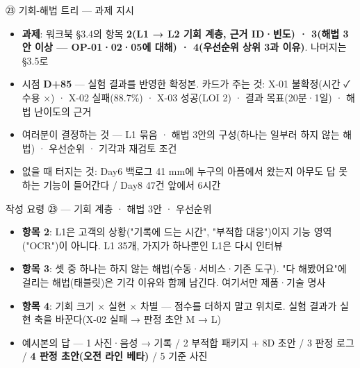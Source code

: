 \begin{frame}{㉓ 기회-해법 트리 — 과제 지시}
\begin{itemize}
\item \textbf{과제}: 워크북 §3.4의 항목 \textbf{2(L1 → L2 기회 계층, 근거 ID·빈도) · 3(해법 3안 이상 — OP-01·02·05에 대해) · 4(우선순위 상위 3과 이유)}. 나머지는 §3.5로
\item 시점 \textbf{D+85} — 실험 결과를 반영한 확정본. 카드가 주는 것: X-01 불확정(시간 ✓ 수용 ×) · X-02 실패(88.7\%) · X-03 성공(LOI 2) · 결과 목표(20분·1일) · 해법 난이도의 근거
\item 여러분이 결정하는 것 — L1 묶음 · 해법 3안의 구성(하나는 일부러 하지 않는 해법) · 우선순위 · 기각과 재검토 조건
\item 없을 때 터지는 것: Day6 백로그 41 mm에 누구의 아픔에서 왔는지 아무도 답 못 하는 기능이 들어간다 / Day8 47건 앞에서 6시간
\end{itemize}
\end{frame}

\begin{frame}{작성 요령 ㉓ — 기회 계층 · 해법 3안 · 우선순위}
\begin{itemize}
\item \textbf{항목 2}: L1은 고객의 상황("기록에 드는 시간", "부적합 대응")이지 기능 영역("OCR")이 아니다. L1 3\til{}5개, 가지가 하나뿐인 L1은 다시 인터뷰
\item \textbf{항목 3}: 셋 중 하나는 하지 않는 해법(수동·서비스·기존 도구). "다 해봤어요"에 걸리는 해법(태블릿)은 기각 이유와 함께 남긴다. 여기서만 제품·기술 명사
\item \textbf{항목 4}: 기회 크기 × 실현 × 차별 — 점수를 더하지 말고 위치로. 실험 결과가 실현 축을 바꾼다(X-02 실패 → 판정 초안 M → L)
\item 예시본의 답 — 1 사진·음성 → 기록 / 2 부적합 패키지 + 8D 초안 / 3 판정 로그 / \textbf{4 판정 초안(오전 라인 베타)} / 5 기준 사진
\end{itemize}
\end{frame}

